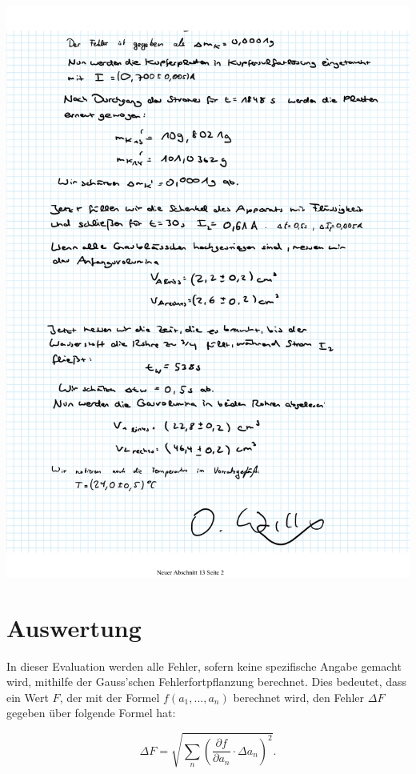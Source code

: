 \documentclass{article}
\begin{document}
\includegraphics[width=\textwidth]{graphics/mess2.jpg}
\newpage

\section{Auswertung}

In dieser Evaluation werden alle Fehler, sofern keine spezifische Angabe gemacht wird, mithilfe der Gauss'schen Fehlerfortpflanzung berechnet. Dies bedeutet, dass ein Wert $F$, der mit der Formel $f(a_1, ..., a_n)$ berechnet wird, den Fehler $\Delta F$ gegeben über folgende Formel hat:

\begin{equation}
    \Delta F = \sqrt{\sum_n \left( \frac{\partial f}{\partial a_n} \cdot \Delta a_n \right)^2}.
\end{equation}
\end{document}
